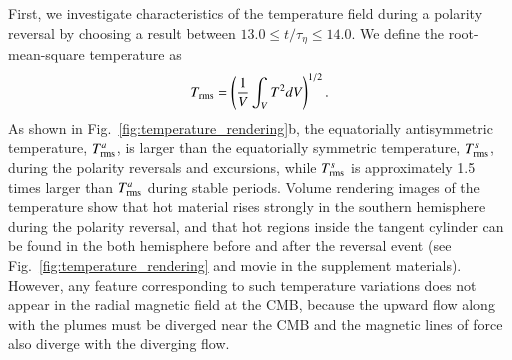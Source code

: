First, we investigate characteristics of the temperature field during a polarity reversal by choosing a result between $13.0 \le t/\tau_{\eta} \le 14.0$. 
{\color{teal}
We define the root-mean-square temperature as
%
\begin{equation}
T_{\rm rms} = \left( \frac{1}{V}
  \int_V T^2 d V \right)^{1/2} .
\label{eq:Trms}
\end{equation}
%
}
{\color{teal}
As shown in Fig.~\ref{fig:temperature_rendering}b, the equatorially antisymmetric temperature, $T_{\rm rms}^a$, is larger than the equatorially symmetric temperature, $T_{\rm rms}^s$, during the polarity reversals and excursions, while $T_{\rm rms}^s$ is approximately 1.5 times larger than $T_{\rm rms}^a$ during stable periods.
}
Volume rendering images of the temperature show that hot material rises strongly in the southern hemisphere during the polarity reversal, and that hot regions inside the tangent cylinder can be found in the both hemisphere before and after the reversal event
(see Fig.~\ref{fig:temperature_rendering} and movie in the supplement materials). 
{\color{teal}
However, any feature corresponding to such temperature variations does not appear in the radial magnetic field at the CMB, 
}
because the upward flow along with the plumes must be diverged near the CMB and the magnetic lines of force also diverge with the diverging flow.

